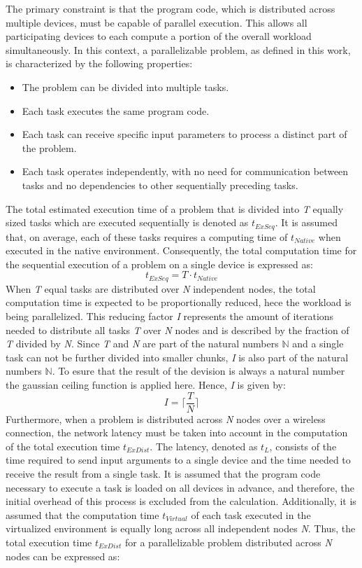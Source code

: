 The primary constraint is that the program code, which is distributed across multiple devices, must be capable of parallel execution. This allows all participating devices to  each compute a portion of the overall workload simultaneously. In this context, a parallelizable problem, as defined in this work, is characterized by the following properties:
\begin{itemize}
  \item The problem can be divided into multiple tasks.
  \item Each task executes the same program code.
  \item Each task can receive specific input parameters to process a distinct part of the problem.
  \item Each task operates independently, with no need for communication between tasks and no dependencies to other sequentially preceding tasks.
\end{itemize}
The total estimated execution time of a problem that is divided into \emph{T} equally sized tasks which are executed sequentially is denoted as $t_{ExSeq}$. It is assumed that, on average, each of these tasks requires a computing time of $t_{Native}$ when executed in the native environment. Consequently, the total computation time for the sequential execution of a problem on a single device is expressed as:
\begin{equation}
  t_{ExSeq} = T \cdot t_{Native}
  \label{equ:single}
\end{equation}
When \emph{T} equal tasks are distributed over \emph{N} independent nodes, the total computation time is expected to be proportionally reduced, hece the workload is being parallelized. This reducing factor \emph{I} represents the amount of iterations needed to distribute all tasks \emph{T} over \emph{N} nodes and is described by the fraction of \emph{T} divided by \emph{N}. Since \emph{T} and \emph{N} are part of the natural numbers $\mathbb{N}$ and a single task can not be further divided into smaller chunks, \emph{I} is also part of the natural numbers $\mathbb{N}$. To esure that the result of the devision is always a natural number the gaussian ceiling function is applied here. Hence, \emph{I} is given by: 
\begin{equation}
  I = \bigg\lceil\frac{T}{N}\bigg\rceil
  \label{equ:frac}
\end{equation}
Furthermore, when a problem is distributed across \emph{N} nodes over a wireless connection, the network latency must be taken into account in the computation of the total execution time $t_{ExDist}$. The latency, denoted as $t_{L}$, consists of the time required to send input arguments to a single device and the time needed to receive the result from a single task. It is assumed that the program code necessary to execute a task is loaded on all devices in advance, and therefore, the initial overhead of this process is excluded from the calculation. Additionally, it is assumed that the computation time $t_{Virtual}$ of each task executed in the virtualized environment is equally long across all independent nodes \emph{N}. Thus, the total execution time $t_{ExDist}$ for a parallelizable problem distributed across \emph{N} nodes can be expressed as:
